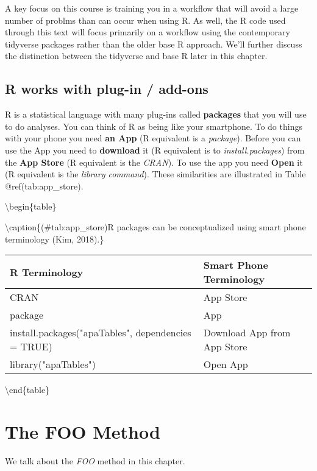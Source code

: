 \documentclass[
]{krantz}
\begin{document}
A key focus on this course is training you in a workflow that will avoid a large number of problms than can occur when using R. As well, the R code used through this text will focus primarily on a workflow using the contemporary tidyverse packages rather than the older base R approach. We'll further discuss the distinction between the tidyverse and base R later in this chapter.

\hypertarget{r-works-with-plug-in-add-ons}{%
\section{R works with plug-in / add-ons}\label{r-works-with-plug-in-add-ons}}

R is a statistical language with many plug-ins called \textbf{packages} that you will use to do analyses. You can think of R as being like your smartphone. To do things with your phone you need \textbf{an App} (R equivalent is a \emph{package}). Before you can use the App you need to \textbf{download} it (R equivalent is to \emph{install.packages}) from the \textbf{App Store} (R equivalent is the \emph{CRAN}). To use the app you need \textbf{Open} it (R equivalent is the \emph{library command}). These similarities are illustrated in Table @ref(tab:app\_store).

\textbackslash begin\{table\}

\textbackslash caption\{(\#tab:app\_store)R packages can be conceptualized using smart phone terminology (Kim, 2018).\}
\centering

\begin{tabular}[t]{ll}
\toprule
R Terminology & Smart Phone Terminology\\
\midrule
CRAN & App Store\\
package & App\\
install.packages("apaTables", dependencies = TRUE) & Download App from App Store\\
library("apaTables") & Open App\\
\bottomrule
\end{tabular}

\textbackslash end\{table\}

\hypertarget{the-foo-method}{%
\chapter{The FOO Method}\label{the-foo-method}}

We talk about the \emph{FOO} method in this chapter.
\end{document}
